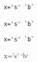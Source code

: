 \documentclass{article}
\begin{document}
\begin{Verbatim}
x='s' `b`
\end{Verbatim}
\verb|x='s' `b`|
\begin{verbatim}
x='s' `b`
\end{verbatim}
\begin{verbatim*}
x='s' `b`
\end{verbatim*}
\end{document}
